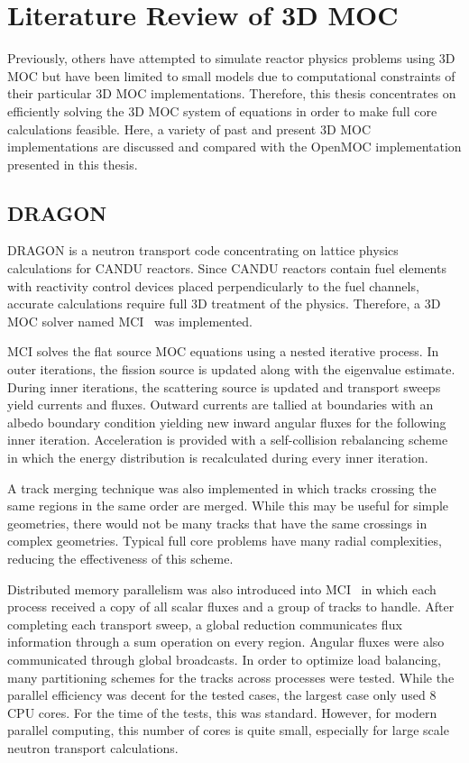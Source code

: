 \section{Literature Review of 3D MOC}
\label{sec:lit-review}

Previously, others have attempted to simulate reactor physics problems using 3D \ac{MOC} but have been limited to small models due to computational constraints of their particular 3D \ac{MOC} implementations. Therefore, this thesis concentrates on efficiently solving the 3D \ac{MOC} system of equations in order to make full core calculations feasible. Here, a variety of past and present 3D \ac{MOC} implementations are discussed and compared with the OpenMOC implementation presented in this thesis.

\subsection{DRAGON}
\label{sec:dragon}
DRAGON is a neutron transport code concentrating on lattice physics calculations for CANDU reactors. Since CANDU reactors contain fuel elements with reactivity control devices placed perpendicularly to the fuel channels, accurate calculations require full 3D treatment of the physics. Therefore, a 3D \ac{MOC} solver named MCI~\cite{dragon_3d_moc} was implemented. 

MCI solves the flat source \ac{MOC} equations using a nested iterative process. In outer iterations, the fission source is updated along with the eigenvalue estimate. During inner iterations, the scattering source is updated and transport sweeps yield currents and fluxes. Outward currents are tallied at boundaries with an albedo boundary condition yielding new inward angular fluxes for the following inner iteration. Acceleration is provided with a self-collision rebalancing scheme in which the energy distribution is recalculated during every inner iteration.

A track merging technique was also implemented in which tracks crossing the same regions in the same order are merged. While this may be useful for simple geometries, there would not be many tracks that have the same crossings in complex geometries. Typical full core problems have many radial complexities, reducing the effectiveness of this scheme.

Distributed memory parallelism was also introduced into MCI~\cite{dragon_parallel} in which each process received a copy of all scalar fluxes and a group of tracks to handle. After completing each transport sweep, a global reduction communicates flux information through a sum operation on every region. Angular fluxes were also communicated through global broadcasts. In order to optimize load balancing, many partitioning schemes for the tracks across processes were tested. While the parallel efficiency was decent for the tested cases, the largest case only used 8 CPU cores. For the time of the tests, this was standard. However, for modern parallel computing, this number of cores is quite small, especially for large scale neutron transport calculations.

